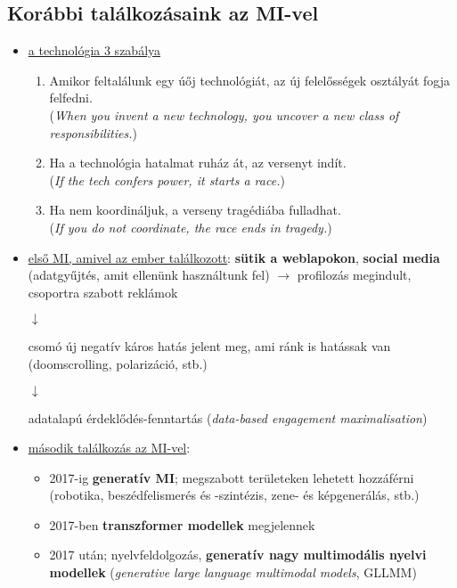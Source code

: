 \documentclass[a4paper, 11pt]{article}
\begin{document}
\subsection{Korábbi találkozásaink az MI-vel}
\begin{itemize}
	\item \underline{a technológia 3 szabálya}
	\begin{enumerate}
		\item Amikor feltalálunk egy úőj technológiát, az új felelősségek osztályát fogja felfedni. \\ (\textit{When you invent a new technology, you uncover a new class of responsibilities.})
		\item Ha a technológia hatalmat ruház át, az versenyt indít. \\ (\textit{If the tech confers power, it starts a race.})
		\item Ha nem koordináljuk, a verseny tragédiába fulladhat. \\ (\textit{If you do not coordinate, the race ends in tragedy.})
	\end{enumerate}
	\item \underline{első MI, amivel az ember találkozott}: \textbf{sütik a weblapokon}, \textbf{social media} (adatgyűjtés, amit ellenünk használtunk fel) $\to$ profilozás megindult, csoportra szabott reklámok 
	\begin{center}		
		$\downarrow$
		
		csomó új negatív káros hatás jelent meg, ami ránk is hatássak van \\ (doomscrolling, polarizáció, stb.)
		
		$\downarrow$
		
		adatalapú érdeklődés-fenntartás (\textit{data-based engagement maximalisation})
	\end{center}
	\item \underline{második találkozás az MI-vel}: 
	\begin{itemize}
		\item 2017-ig \textbf{generatív MI}; megszabott területeken lehetett hozzáférni (robotika, beszédfelismerés és -szintézis, zene- és képgenerálás, stb.)
		\item 2017-ben \textbf{transzformer modellek} megjelennek
		\item 2017 után; nyelvfeldolgozás, \textbf{generatív nagy multimodális nyelvi modellek} (\textit{generative large language multimodal models}, GLLMM)
	\end{itemize}
\end{itemize}
\end{document}
